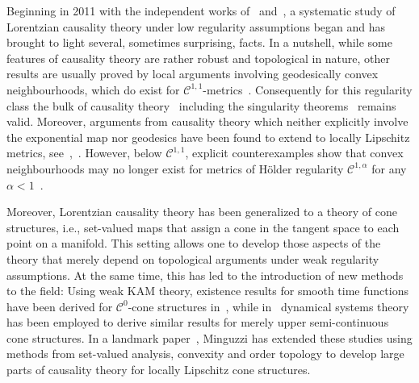 \documentclass[reqno]{amsart}
\numberwithin{equation}{section}
\theoremstyle{plain}
\theoremstyle{definition}
\theoremstyle{remark}
\begin{document}
Beginning in 2011 with the independent works of~\cite{FS:12} and~\cite{CG:12}, a systematic study of Lorentzian causality theory under low 
regularity assumptions began and has brought to light several, sometimes 
surprising, facts. In a nutshell, while some features of causality theory are 
rather robust and topological in nature, other results are usually proved by 
local arguments involving geodesically convex neighbourhoods, which do exist for 
$\mathcal{C}^{1,1}$-metrics~\cite{Min:15,KSS:14}. Consequently for this regularity class 
the bulk of causality theory~\cite{CG:12,Min:15,KSSV:14} including the 
singularity theorems~\cite{KSSV:15,KSV:15,GGKS:18} remains valid. Moreover, 
arguments from causality theory which neither explicitly involve the exponential 
map nor geodesics have been found to extend to locally Lipschitz metrics, see~\cite[Thm.\ 1.25]{CG:12},~\cite[Rem.\ 2.5]{Min:19}. 
However, below $\mathcal{C}^{1,1}$, explicit counterexamples show that convex neighbourhoods may no longer exist 
for metrics of H\"older regularity $\mathcal{C}^{1,\alpha}$ for any $\alpha<1$~\cite{HW:51,SS:18}. 

Moreover, Lorentzian causality theory has been generalized to a theory of 
cone structures, i.e., set-valued maps that assign a cone in the tangent space 
to each point on a manifold. This setting allows one to develop those aspects of 
the theory that merely depend on topological arguments under weak regularity 
assumptions. At the same time, this has led to the introduction of new methods to the 
field: Using weak KAM theory, existence results for smooth time functions 
have been derived for $\mathcal{C}^0$-cone structures in~\cite{FS:12, F:15}, while in~\cite{BS:18} dynamical systems theory has been employed to derive similar 
results for merely upper semi-continuous cone structures. In a landmark paper~\cite{Min:19}, Minguzzi has extended these studies using methods from set-valued 
analysis, convexity and order topology to develop large parts of causality theory for locally Lipschitz cone structures.
\end{document}
